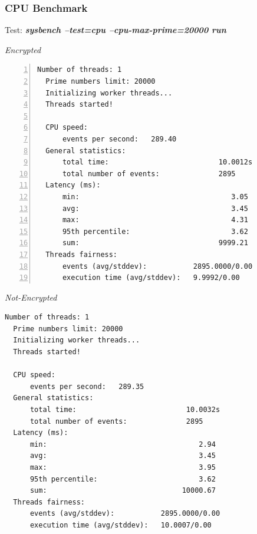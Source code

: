\newpage
\subsubsection{CPU Benchmark}
\begin{center}
  Test: \textbf{\textit{sysbench --test=cpu --cpu-max-prime=20000 run}}  
\end{center}
\vspace*{-\baselineskip}
\noindent\begin{minipage}[t]{0.45\linewidth}
  \centering
  \textit{Encrypted}
  \begin{lstlisting}[basicstyle=\tiny,frame=single, numbers=left, label=cpu_test1]
  Number of threads: 1
  Prime numbers limit: 20000
  Initializing worker threads...
  Threads started!
  
  CPU speed:
      events per second:   289.40
  General statistics:
      total time:                          10.0012s
      total number of events:              2895
  Latency (ms):
      min:                                    3.05
      avg:                                    3.45
      max:                                    4.31
      95th percentile:                        3.62
      sum:                                 9999.21
  Threads fairness:
      events (avg/stddev):           2895.0000/0.00
      execution time (avg/stddev):   9.9992/0.00
  \end{lstlisting}
\end{minipage}
\hspace{0.5cm}
\noindent\begin{minipage}[t]{0.45\linewidth}
  \centering
  \textit{Not-Encrypted}
  \begin{lstlisting}[basicstyle=\tiny,frame=single, label=cpu_test2]
  Number of threads: 1
  Prime numbers limit: 20000
  Initializing worker threads...
  Threads started!
  
  CPU speed:
      events per second:   289.35
  General statistics:
      total time:                          10.0032s
      total number of events:              2895
  Latency (ms):
      min:                                    2.94
      avg:                                    3.45
      max:                                    3.95
      95th percentile:                        3.62
      sum:                                10000.67
  Threads fairness:
      events (avg/stddev):           2895.0000/0.00
      execution time (avg/stddev):   10.0007/0.00
  \end{lstlisting}
\end{minipage}


